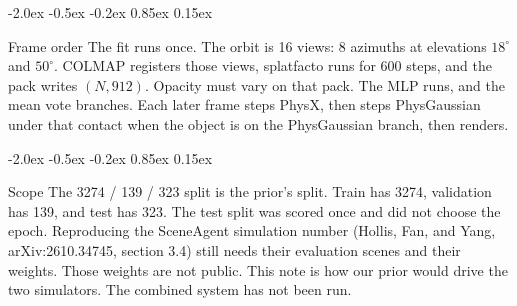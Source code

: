 \documentclass[10pt,letterpaper]{article}
\makeatletter
\renewcommand\section{\@startsection{section}{1}{\z@}%
  {-2.0ex \@plus -0.5ex \@minus -0.2ex}%
  {0.85ex \@plus 0.15ex}%
  {\large\bfseries\raggedright}}
\DeclareRobustCommand{\_}{\textunderscore\allowbreak}
\makeatother
\begin{document}
\section{Frame order}
The fit runs once.
The orbit is 16 views: 8 azimuths at elevations \(18^\circ\) and \(50^\circ\).
COLMAP registers those views, splatfacto runs for 600 steps, and the pack writes \((N, 912)\).
Opacity must vary on that pack.
The MLP runs, and the mean vote branches.
Each later frame steps PhysX, then steps PhysGaussian under that contact when the object is on the PhysGaussian branch, then renders.

\section{Scope}
The 3274 / 139 / 323 split is the prior's split.
Train has 3274, validation has 139, and test has 323.
The test split was scored once and did not choose the epoch.
Reproducing the SceneAgent simulation number (Hollis, Fan, and Yang, arXiv:2610.34745, section 3.4) still needs their evaluation scenes and their weights.
Those weights are not public.
This note is how our prior would drive the two simulators.
The combined system has not been run.
\end{document}
